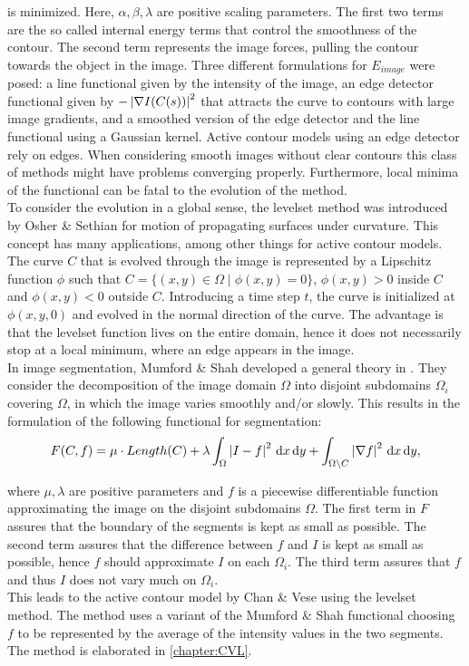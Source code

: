 is minimized. Here, $\alpha, \beta, \lambda$ are positive scaling parameters. The first two terms are the so called internal energy terms that control the smoothness of the contour. The second term represents the image forces, pulling the contour towards the object in the image. Three different formulations for $E_{image}$ were posed: a line functional given by the intensity of the image, an edge detector functional given by $-\left| {\nabla I(C(s))} \right|^2$ that attracts the curve to contours with large image gradients, and a smoothed version of the edge detector and the line functional using a Gaussian kernel. Active contour models using an edge detector rely on edges. When considering smooth images without clear contours this class of methods might have problems converging properly. Furthermore, local minima of the functional can be fatal to the evolution of the method.\\

To consider the evolution in a global sense, the levelset method was introduced by Osher \& Sethian \cite{osher.88} for motion of propagating surfaces under curvature. This concept has many applications, among other things for active contour models. The curve $C$ that is evolved through the image is represented by a Lipschitz function $\phi$ such that $C=\{(x,y)\in\Omega\;|\; \phi(x,y) = 0\}$, $\phi(x,y)> 0$ inside $C$ and $\phi(x,y)<0$ outside $C$. Introducing a time step $t$, the curve is initialized at $\phi(x,y,0)$ and evolved in the normal direction of the curve. The advantage is that the levelset function lives on the entire domain, hence it does not necessarily stop at a local minimum, where an edge appears in the image.\\

In image segmentation, Mumford \& Shah developed a general theory in \cite{mumford.89}. They consider the decomposition of the image domain $\Omega$ into disjoint subdomains $\Omega_i$ covering $\Omega$, in which the image varies smoothly and/or slowly. This results in the formulation of the following functional for segmentation:
\begin{equation}
  F(C,f) = \mu\cdot Length(C) + \lambda \int_\Omega \left| {I-f} \right|^2 \,{\rm d} x\,{\rm d} y + \int_{\Omega\backslash C} \left| {\nabla f} \right|^2 \,{\rm d} x\,{\rm d} y,
\end{equation}

where $\mu,\lambda$ are positive parameters and $f$ is a piecewise differentiable function approximating the image on the disjoint subdomains $\Omega$. The first term in $F$ assures that the boundary of the segments is kept as small as possible. The second term assures that the difference between $f$ and $I$ is kept as small as possible, hence $f$ should approximate $I$ on each $\Omega_i$. The third term assures that $f$ and thus $I$ does not vary much on $\Omega_i$.\\
This leads to the active contour model by Chan \& Vese \cite{chan.01} using the levelset method. The method uses a variant of the Mumford \& Shah functional choosing $f$ to be represented by the average of the intensity values in the two segments. The method is elaborated in \cref{chapter:CVL}.\\

